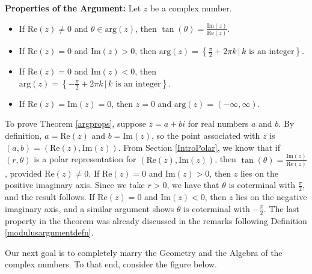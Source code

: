 \colorbox{ResultColor}{\bbm

\begin{thm} \label{argprops} \textbf{Properties of the Argument:}  Let $z$ be a complex number.  
 
\begin{itemize}

\item  If $\text{Re}(z) \neq 0$ and $\theta \in \text{arg}(z)$, then $\tan(\theta) = \frac{\text{Im}(z)}{\text{Re}(z)}$.

\item  If $\text{Re}(z) = 0$ and  $\text{Im}(z) > 0$, then $\text{arg}(z) = \left\{ \frac{\pi}{2} + 2\pi k \, | \, \text{$k$ is an integer} \right\}$.

\item  If $\text{Re}(z) = 0$ and $\text{Im}(z) < 0$, then $\text{arg}(z) = \left\{ -\frac{\pi}{2} + 2\pi k \, | \, \text{$k$ is an integer} \right\}$.

\item  If $\text{Re}(z) = \text{Im}(z) = 0$, then $z = 0$ and $\text{arg}(z) = (-\infty, \infty)$.

\end{itemize}

\end{thm}
\ebm}

\smallskip

To prove Theorem \ref{argprops}, suppose $z = a + bi$ for real numbers $a$ and $b$.  By definition, $a = \text{Re}(z)$ and $b = \text{Im}(z)$, so the point associated with $z$ is $(a,b) = \left(\text{Re}(z), \text{Im}(z)\right)$.  From Section \ref{IntroPolar}, we know that if $(r,\theta)$ is a polar representation for $\left(\text{Re}(z), \text{Im}(z)\right)$, then $\tan(\theta) = \frac{\text{Im}(z)}{\text{Re}(z)}$, provided $\text{Re}(z) \neq 0$.  If $\text{Re}(z) = 0$ and $\text{Im}(z) > 0$, then $z$ lies on the positive imaginary axis.  Since we take $r > 0$,  we have that $\theta$ is coterminal with $\frac{\pi}{2}$, and the result follows.   If $\text{Re}(z) = 0$ and $\text{Im}(z) < 0$, then $z$ lies on the negative imaginary axis, and a similar argument shows $\theta$ is coterminal with $-\frac{\pi}{2}$.  The last property in the theorem was already discussed in the remarks following Definition \ref{modulusargumentdefn}.  

\smallskip


Our next goal is to completely marry the Geometry and the Algebra of the complex numbers.  To that end,  consider the figure below.

